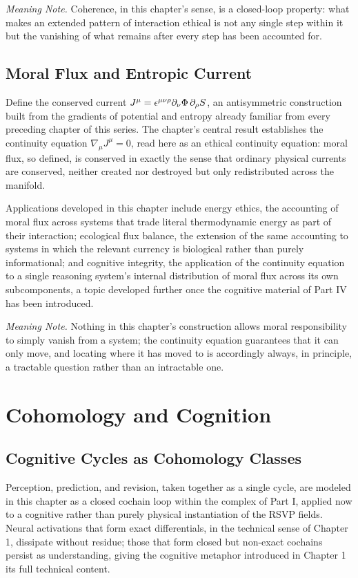 \emph{Meaning Note.} Coherence, in this chapter's sense, is a closed-loop property: what makes an extended pattern of interaction ethical is not any single step within it but the vanishing of what remains after every step has been accounted for.

\chapter{Moral Flux and Entropic Current}

Define the conserved current $J^\mu = \epsilon^{\mu\nu\rho} \partial_\nu \Phi \, \partial_\rho S$, an antisymmetric construction built from the gradients of potential and entropy already familiar from every preceding chapter of this series. The chapter's central result establishes the continuity equation $\nabla_\mu J^\mu = 0$, read here as an ethical continuity equation: moral flux, so defined, is conserved in exactly the sense that ordinary physical currents are conserved, neither created nor destroyed but only redistributed across the manifold.

Applications developed in this chapter include energy ethics, the accounting of moral flux across systems that trade literal thermodynamic energy as part of their interaction; ecological flux balance, the extension of the same accounting to systems in which the relevant currency is biological rather than purely informational; and cognitive integrity, the application of the continuity equation to a single reasoning system's internal distribution of moral flux across its own subcomponents, a topic developed further once the cognitive material of Part IV has been introduced.

\emph{Meaning Note.} Nothing in this chapter's construction allows moral responsibility to simply vanish from a system; the continuity equation guarantees that it can only move, and locating where it has moved to is accordingly always, in principle, a tractable question rather than an intractable one.

\part{Cohomology and Cognition}

\chapter{Cognitive Cycles as Cohomology Classes}

Perception, prediction, and revision, taken together as a single cycle, are modeled in this chapter as a closed cochain loop within the complex of Part I, applied now to a cognitive rather than purely physical instantiation of the RSVP fields. Neural activations that form exact differentials, in the technical sense of Chapter 1, dissipate without residue; those that form closed but non-exact cochains persist as understanding, giving the cognitive metaphor introduced in Chapter 1 its full technical content.

